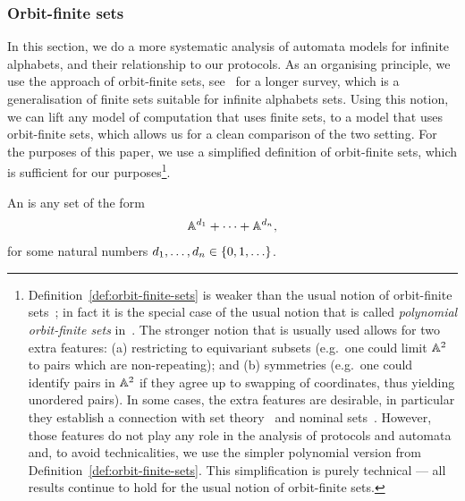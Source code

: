 \subsubsection{Orbit-finite sets}
\label{sec:orbit-finite-sets}
\AP
In this section, we do a more systematic analysis of automata models for
infinite alphabets, and their relationship to our protocols. As an organising
principle, we use the approach of orbit-finite sets,
see~\cite{bojanczykOrbitFiniteSetsTheir2017} for a longer survey, which is a
generalisation of finite sets suitable for infinite alphabets sets. Using this
notion, we can lift any model of computation that uses finite sets, to a model
that uses orbit-finite sets, which allows us for a clean comparison of the two
setting. For the purposes of this paper, we use a simplified definition of
orbit-finite sets, which is sufficient for our purposes\footnote{
Definition~\ref{def:orbit-finite-sets} is weaker than the usual notion of orbit-finite sets~\cite[Section 5]{bojanczyk_slightly}; in fact it is the special case of the usual notion that is called \emph{polynomial orbit-finite sets} in~\cite[Section 1]{bojanczyk_slightly}.
The stronger  notion that is usually used  allows for two extra features: (a) restricting to equivariant subsets (e.g.~one could limit $\mathbb A^2$ to pairs which are non-repeating); and (b)  symmetries (e.g.~one could identify pairs in $\mathbb A^2$ if they agree up to swapping of coordinates, thus yielding unordered pairs). In some cases, the extra features are desirable, in particular they establish a connection with set theory~\cite{blassDedekind2016} and  nominal sets~\cite[Section 5]{PittsAM:nomsns}. However, those features do not play any role in the analysis of protocols and automata and, to avoid technicalities, we use the simpler polynomial version from Definition~\ref{def:orbit-finite-sets}. This simplification is purely technical --- all results continue to hold for the usual notion of orbit-finite sets.
}.
\begin{definition} \label{def:orbit-finite-sets}
  \AP
  An  is any set of the form 
    \begin{align*}
    \mathbb A^{d_1} + \cdots + \mathbb A^{d_n},
    \end{align*}
    for some natural numbers $d_1,\ldots,d_n \in \{0,1,\ldots\}$. 
\end{definition}


